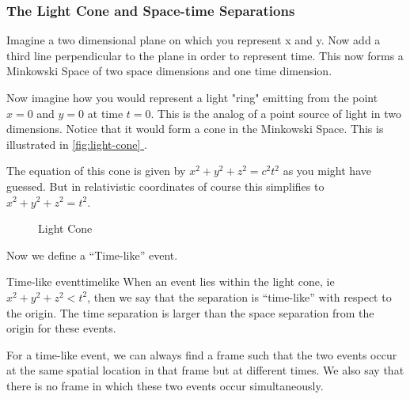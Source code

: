 \documentclass[12pt]{article}
\newcommand*{\fullref}[1]{\hyperref[{#1}]{\autoref*{#1} \nameref*{#1}}}
\numberwithin{equation}{section}
\theoremstyle{plain}
\theoremstyle{definition}
\begin{document}
\subsubsection*{The Light Cone and Space-time Separations}

Imagine a two dimensional plane on which you represent x and y. Now add a third line perpendicular to the plane in order to represent time. This now forms a Minkowski Space of two space dimensions and one time dimension. 

Now imagine how you would represent a light "ring" emitting from the point $x = 0$ and $y = 0$ at time $t = 0$. This is the analog of a point source of light in two dimensions. Notice that it would form a cone in the Minkowski Space. This is illustrated in \fullref{fig:light-cone}.

The equation of this cone is given by $x^2 + y^2 + z^2 = c^2 t^2$ as you might have guessed. But in relativistic coordinates of course this simplifies to $x^2 + y^2 + z^2 = t^2$.

\begin{figure}
    \centering
    \caption{Light Cone}
    \label{fig:light-cone}
\end{figure}

Now we define a ``Time-like'' event.

\begin{defn}{Time-like event}{timelike}
    When an event lies within the light cone, ie $x^2+y^2+z^2 < t^2$, then we say that the separation is ``time-like'' with respect to the origin. The time separation is larger than the space separation from the origin for these events.
\end{defn}

For a time-like event, we can always find a frame such that the two events occur at the same spatial location in that frame but at different times. We also say that there is no frame in which these two events occur simultaneously.
\end{document}
